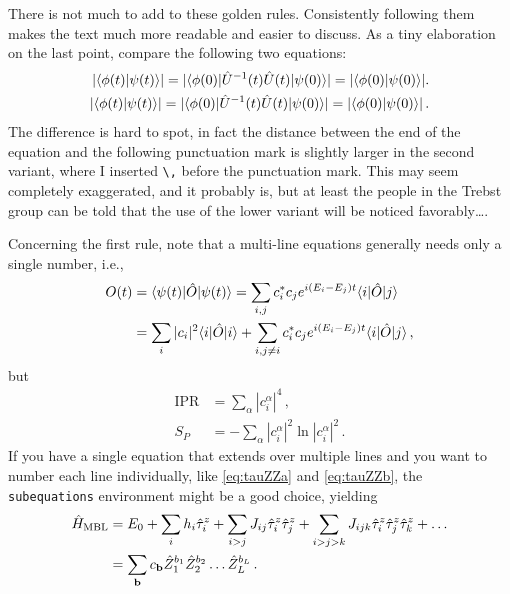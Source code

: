 There is not much to add to these golden rules. Consistently following them makes the text much more readable and easier to discuss. As a tiny elaboration on the last point, compare the following two equations:
\begin{align}
	|\langle \phi (t) | \psi(t) \rangle| = |\langle \phi(0) | \hat{U}^{-1}(t) \hat{U}(t) | \psi(0)  \rangle| = |\langle \phi (0) | \psi(0) \rangle|. \\ 
	|\langle \phi (t) | \psi(t) \rangle| = |\langle \phi(0) | \hat{U}^{-1}(t) \hat{U}(t) | \psi(0)  \rangle| = |\langle \phi (0) | \psi(0) \rangle|\,.
\end{align}
The difference is hard to spot, in fact the distance between the end of the equation and the following punctuation mark is slightly larger in the second variant, where I inserted \verb|\,| before the punctuation mark.
This may seem completely exaggerated, and it probably is, but at least the people in the Trebst group can be told that the use of the lower variant will be noticed favorably\ldots.

Concerning the first rule, note that a multi-line equations generally needs only a single number, i.e.,
\begin{align}
	O(t) &= \langle \psi(t) | \hat{O} | \psi(t) \rangle = \sum_{i,j} c_i^* c_j e^{i \left( E_i - E_j \right)t} \langle i |\hat{O}| j\rangle  \nonumber \\ & = \sum_i |c_i|^2 \langle i |\hat{O}| i \rangle + \sum_{i,j\neq i} c_i^*c_j e^{i \left( E_i - E_j \right) t} \langle i |\hat{O}| j\rangle\,,
\end{align}
but
\begin{align} 
	\mathrm{IPR} &= \sum_\alpha |c_i^\alpha|^4\,,\\
	S_P &= - \sum_\alpha |c_i^\alpha|^2 \ln |c_i^\alpha|^2 \,.
\end{align}
If you have a single equation that extends over multiple lines and you want to number each line individually, like \eqref{eq:tauZZa} and \eqref{eq:tauZZb}, the \verb|subequations| environment might be a good choice, yielding
\begin{subequations}
\begin{align}
	\hat{H}_\text{MBL} &= E_0 + \sum \limits_i h_i \hat{\tau}_i^z + \sum \limits_{i>j} J_{ij} \hat{\tau}_i^z \hat{\tau}_j^z + \sum \limits_{i>j>k} J_{ijk} \hat{\tau}_i^z \hat{\tau}_j^z \hat{\tau}_k^z + \dots \label{eq:tauZZa} \\&= \sum_{\textbf{b}} c_{\textbf{b}} \hat{Z}_1^{b_1} \hat{Z}_2^{b_2} \dots \hat{Z}_L^{b_L}\,. \label{eq:tauZZb}
\end{align}
\end{subequations}

